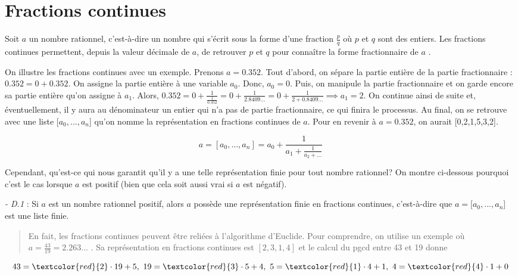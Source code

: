\renewcommand{\theequation}{C.\arabic{equation}}
\setcounter{equation}{0}
\section{Fractions continues}
Soit $a$ un nombre rationnel, c'est-à-dire un nombre qui s'écrit sous la forme d'une fraction $\frac{p}{q}$ où $p$ et $q$ sont des entiers. Les fractions continues permettent, depuis la valeur décimale de $a$, de retrouver $p$ et $q$ pour connaître la forme fractionnaire de $a$ \cite{hardy75}. 

On illustre les fractions continues avec un exemple. Prenons $a = 0.352$. Tout d'abord, on sépare la partie entière de la partie fractionnaire : $ 0.352 = 0 + 0.352$. On assigne la partie entière à une variable $a_0$. Donc, $a_0 = 0$. Puis, on manipule la partie fractionnaire et on garde encore sa partie entière qu'on assigne à $a_1$. Alors, $0.352 = 0 + \frac{1}{\frac{1}{0.352}} = 0 + \frac{1}{2.8409...} = 0 + \frac{1}{2 + 0.8409...} \implies a_1 = 2$. On continue ainsi de suite et, éventuellement, il y aura au dénominateur un entier qui n'a pas de partie fractionnaire, ce qui finira le processus. Au final, on se retrouve avec une liste [$a_0, ..., a_n$] qu'on nomme la représentation en fractions continues de $a$. Pour en revenir à $a = 0.352$, on aurait [0,2,1,5,3,2].

\begin{equation*}
    a = [a_0, ..., a_n] = a_0 + \frac{1}{a_1 + \frac{1}{a_2 + ...}}
\end{equation*}

Cependant, qu'est-ce qui nous garantit qu'il y a une telle représentation finie pour tout nombre rationnel? On montre ci-dessous pourquoi c'est le cas lorsque  $a$ est positif (bien que cela soit aussi vrai si $a$ est négatif).

\textit{- D.1} : Si $a$ est un nombre rationnel positif, alors $a$ possède une représentation finie en fractions continues, c'est-à-dire que $a =[a_0, ..., a_n$] est une liste finie.

\begin{quote}
    En fait, les fractions continues peuvent être reliées à l'algorithme d'Euclide. Pour comprendre, on utilise un exemple où $a = \frac{43}{19} = 2.263...$ . Sa représentation en fractions continues est $[2,3,1,4]$ et le calcul du pgcd entre 43 et 19 donne 
\end{quote}

\begin{equation*}
    43 = \textcolor{red}{2} \cdot 19 + 5,\ 19 = \textcolor{red}{3} \cdot 5 + 4,\ 5 = \textcolor{red}{1} \cdot 4 + 1,\ 4 = \textcolor{red}{4} \cdot 1 + 0
\end{equation*}

